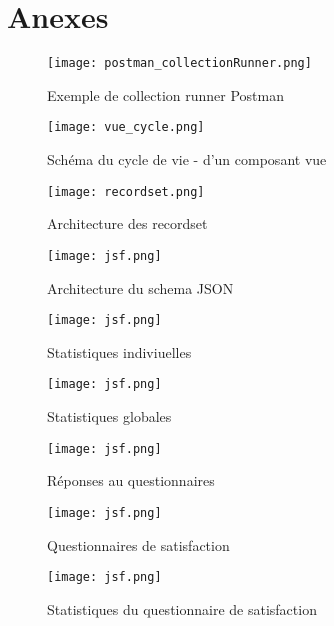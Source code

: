 \section{Anexes}

\begin{figure}[htbp]
    \center
    \texttt{[image: postman\_collectionRunner.png]}
    \label{fig:postman_collectionRunner}
    \caption{Exemple de collection runner Postman}
\end{figure}

\begin{figure}[htbp]
    \center
    \texttt{[image: vue\_cycle.png]}
    \label{fig:vue_cycle}
    \caption{Schéma du cycle de vie - d'un composant vue\cite{vuelifecycle}}
\end{figure}
    
\begin{figure}[htbp]
    \center 
    \texttt{[image: recordset.png]}
    \label{fig:recordset}
    \caption{Architecture des recordset}
\end{figure}
\begin{figure}[htbp]
    \center 
    \texttt{[image: jsf.png]}
    \label{fig:jsf}
    \caption{Architecture du schema JSON}
\end{figure}


\begin{figure}[htbp]
    \center 
    \texttt{[image: jsf.png]}
    \label{fig:statindi}
    \caption{Statistiques indiviuelles}
\end{figure}

\begin{figure}[htbp]
    \center 
    \texttt{[image: jsf.png]}
    \label{fig:statglobal}
    \caption{Statistiques globales}
\end{figure}

\begin{figure}[htbp]
    \center 
    \texttt{[image: jsf.png]}
    \label{fig:answer}
    \caption{Réponses au questionnaires}
\end{figure}

\begin{figure}[htbp]
    \center 
    \texttt{[image: jsf.png]}
    \label{fig:satisfaction}
    \caption{Questionnaires de satisfaction}
\end{figure}

\begin{figure}[htbp]
    \center 
    \texttt{[image: jsf.png]}
    \label{fig:satisfactionStat}
    \caption{Statistiques du questionnaire de satisfaction}
\end{figure}

